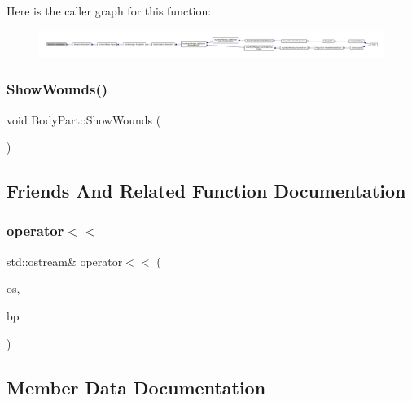 Here is the caller graph for this function\+:
\nopagebreak
\begin{figure}[H]
\begin{center}
\leavevmode
\includegraphics[width=350pt]{d2/d6f/class_body_part_a12897c5566d467977f7bbbe39665c4f5_icgraph}
\end{center}
\end{figure}
\mbox{\label{class_body_part_a59d24b904169031b36cef2f4ba2847f1}} 
\subsubsection{\texorpdfstring{Show\+Wounds()}{ShowWounds()}}
{\footnotesize\ttfamily void Body\+Part\+::\+Show\+Wounds (\begin{DoxyParamCaption}{ }\end{DoxyParamCaption})}



\subsection{Friends And Related Function Documentation}
\mbox{\label{class_body_part_a816ee6d41ee84f770c140a51243cc152}} 
\subsubsection{\texorpdfstring{operator$<$$<$}{operator<<}}
{\footnotesize\ttfamily std\+::ostream\& operator$<$$<$ (\begin{DoxyParamCaption}\item[{std\+::ostream \&}]{os,  }\item[{const \mbox{\hyperlink{class_body_part}{Body\+Part}} \&}]{bp }\end{DoxyParamCaption})\hspace{0.3cm}{\ttfamily [friend]}}



\subsection{Member Data Documentation}
\mbox{\label{class_body_part_a586f1edeb69d40a0894063f6ccc7604b}} 
